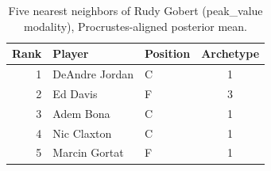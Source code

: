 \begin{table}[htbp]
  \centering\small
  \begin{tabular}{rllc}
    \toprule
    Rank & Player & Position & Archetype \\
    \midrule
    1 & DeAndre Jordan & C & 1 \\
    2 & Ed Davis & F & 3 \\
    3 & Adem Bona & C & 1 \\
    4 & Nic Claxton & C & 1 \\
    5 & Marcin Gortat & F & 1 \\
    \bottomrule
  \end{tabular}
  \caption{Five nearest neighbors of Rudy Gobert (peak_value modality), Procrustes-aligned posterior mean.}
  \label{tab:Rudy_Gobert_neighbors_peak_value}
\end{table}

